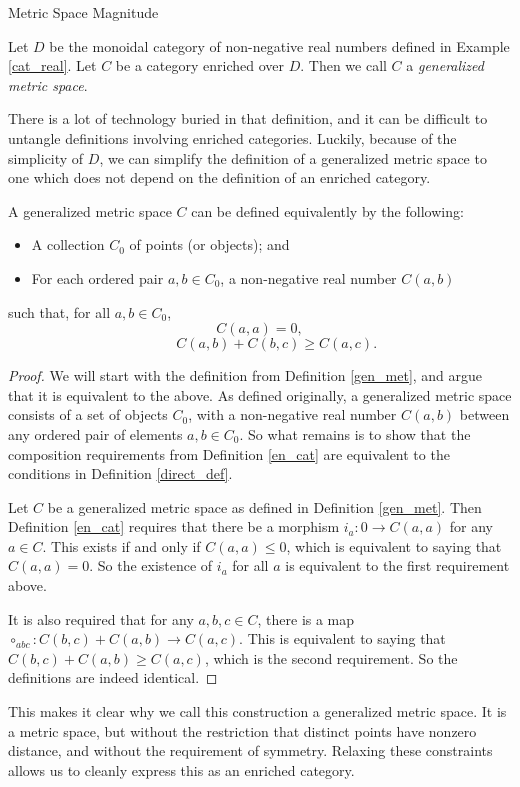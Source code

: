 \documentclass[12pt]{pom_thesis}
\begin{document}
\begin{chapter}{Metric Space Magnitude}
\begin{defn}\label{gen_met}
Let $D$ be the monoidal category of non-negative real numbers defined in Example \ref{cat_real}. Let $C$ be a category enriched over $D$. Then we call $C$ a \emph{generalized metric space}.
\end{defn}
There is a lot of technology buried in that definition, and it can be difficult to untangle definitions involving enriched categories. Luckily, because of the simplicity of $D$, we can simplify the definition of a generalized metric space to one which does not depend on the definition of an enriched category.
\begin{thm}\label{direct_def}
A generalized metric space $C$ can be defined equivalently by the following:
\begin{itemize}
\item A collection $C_0$ of points (or objects); and
\item For each ordered pair $a,b \in C_0$, a non-negative real number $C(a,b)$
\end{itemize}
such that, for all $a,b \in C_0$,
\[C(a,a) = 0,
\]
\[\hspace{1cm} C(a,b) + C(b,c) \geq C(a,c).
\]
\end{thm}
\begin{proof}
We will start with the definition from Definition \ref{gen_met}, and argue that it is equivalent to the above. As defined originally, a generalized metric space consists of a set of objects $C_0$, with a non-negative real number $C(a,b)$ between any ordered pair of elements $a,b \in C_0$. So what remains is to show that the composition requirements from Definition \ref{en_cat} are equivalent to the conditions in Definition  \ref{direct_def}. 

Let $C$ be a generalized metric space as defined in Definition \ref{gen_met}. Then Definition \ref{en_cat} requires that there be a morphism $i_a:0 \rightarrow C(a,a)$ for any $a \in C$. This exists if and only if $C(a,a) \leq 0$, which is equivalent to saying that $C(a,a)=0$. So the existence of $i_a$ for all $a$ is equivalent to the first requirement above.

It is also required that for any $a,b,c \in C$, there is a map $\circ_{abc}: C(b,c) + C(a,b) \rightarrow C(a,c)$. This is equivalent to saying that $C(b,c) + C(a,b) \geq C(a,c)$, which is the second requirement. So the definitions are indeed identical.
\end{proof}

This makes it clear why we call this construction a generalized metric space. It is a metric space, but without the restriction that distinct points have nonzero distance, and without the requirement of symmetry. Relaxing these constraints allows us to cleanly express this as an enriched category.  


\end{chapter}
\end{document}
